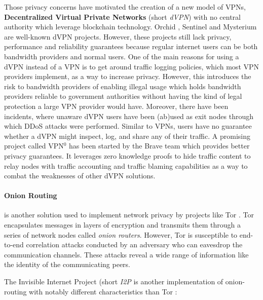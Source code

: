 Those privacy concerns have motivated the creation of a new model of VPNs,
\textbf{Decentralized Virtual Private Networks} (short \textit{dVPN}) with no
central authority which leverage blockchain technology. Orchid \cite{orchid},
Sentinel \cite{sentinel} and Mysterium \cite{mysterium} are well-known dVPN
projects. However, these projects still lack privacy, performance and
reliability guarantees because regular internet users can be both bandwidth
providers and normal users. One of the main reasons for using a dVPN instead of
a VPN is to get around traffic logging policies, which most VPN providers
implement, as a way to increase privacy. However, this introduces the risk to
bandwidth providers of enabling illegal usage which holds bandwidth providers
reliable to government authorities without having the kind of legal protection a
large VPN provider would have. Moreover, there have been incidents, where
unaware dVPN users have been (ab)used as exit nodes through which DDoS attacks
were performed. Similar to VPNs, users have no guarantee whether a dVPN might
inspect, log, and share any of their traffic. A promising project called VPN$^0$
\cite{vpn0} has been started by the Brave team which provides better privacy
guarantees. It leverages zero knowledge proofs to hide traffic content to relay
nodes with traffic accounting and traffic blaming capabilities as a way to
combat the weaknesses of other dVPN solutions.

\paragraph{Onion Routing} is another solution used to implement network
privacy by projects like Tor \cite{tor}. Tor encapsulates messages in layers of
encryption and transmits them through a series of network nodes called
\textit{onion routers}. However, Tor is susceptible to end-to-end correlation attacks conducted by an adversary who can eavesdrop the communication channels. These attacks reveal a wide range of information like the identity of the communicating peers.

The Invisible Internet Project (short \textit{I2P} is another implementation
of onion-routing with notably different characteristics than Tor \cite{i2p} :

